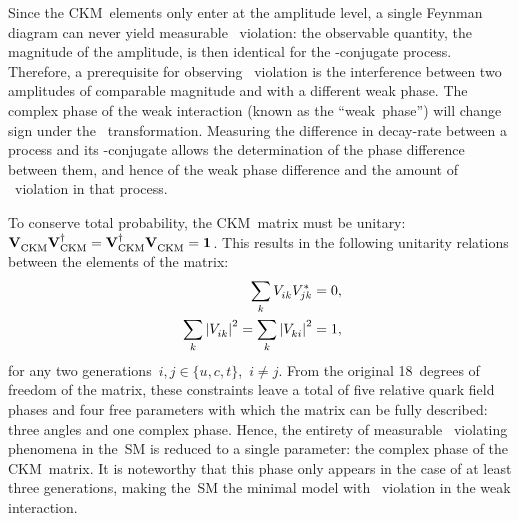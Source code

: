 Since the CKM~elements only enter at the amplitude level, a single Feynman diagram can never yield measurable \CP~violation: the observable quantity, the magnitude of the amplitude, is then identical for the \CP-conjugate process.
Therefore, a prerequisite for observing \CP~violation is the interference between two amplitudes of comparable magnitude and with a different weak phase.
The complex phase of the weak interaction (known as the ``weak~phase'') will change sign under the \CP~transformation.
Measuring the difference in decay-rate between a process and its \CP-conjugate allows the determination of the phase difference between them, and hence of the weak phase difference and the amount of \CP~violation in that process.

To conserve total probability, the CKM~matrix must be unitary:~\({\VCKM\VCKMd = \VCKMd\VCKM = \identitymatrix}\).
This results in the following unitarity relations between the elements of the matrix:
%
\begin{subequations} \label{eqn:theory_CKM_Unitarity}
    \begin{align}
        \sum_{k} \V{ik} \Vs{jk} &= 0 \rlap{,} \label{eqn:theory_CKM_Unitarity_1} \\
        \sum_{k} \abs{\V{ik}}^{2} = \sum_{k} \abs{\V{ki}}^{2} &= 1 \rlap{,} \label{eqn:theory_CKM_Unitarity_2}
    \end{align}
\end{subequations}
%
for any two generations~\({i, j \in \{ u, c, t \}}\),~\({i \neq j}\).
From the original \num{18}~degrees of freedom of the matrix, these constraints leave a total of five relative quark field phases and four free parameters with which the matrix can be fully described: three angles and one complex phase.
Hence, the entirety of measurable \CP~violating phenomena in the~SM is reduced to a single parameter: the complex phase of the CKM~matrix.
It is noteworthy that this phase only appears in the case of at least three generations, making the~SM the minimal model with \CP~violation in the weak interaction.


